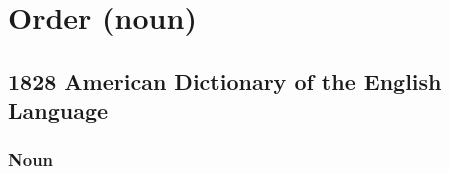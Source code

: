 \section{Order (noun)}
	\label{ORDER}
	

\subsection{1828 American Dictionary of the English Language} %
	\label{ORDER-1828}
	
	\subsubsection{Noun}

